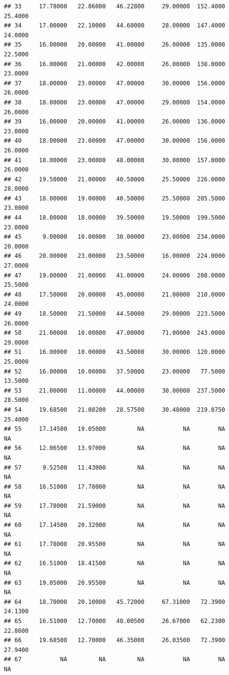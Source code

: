\documentclass[]{article}
\begin{document}
\begin{verbatim}
## 33     17.78000   22.86000   46.22800     29.00000  152.4000     25.4000
## 34     17.00000   22.10000   44.60000     28.00000  147.4000     24.0000
## 35     16.00000   20.00000   41.00000     26.00000  135.0000     22.5000
## 36     16.00000   21.00000   42.00000     26.00000  138.0000     23.0000
## 37     18.00000   23.00000   47.00000     30.00000  156.0000     26.0000
## 38     18.00000   23.00000   47.00000     29.00000  154.0000     26.0000
## 39     16.00000   20.00000   41.00000     26.00000  136.0000     23.0000
## 40     18.00000   23.00000   47.00000     30.00000  156.0000     26.0000
## 41     18.00000   23.00000   48.00000     30.00000  157.0000     26.0000
## 42     19.50000   21.00000   40.50000     25.50000  226.0000     28.0000
## 43     18.00000   19.00000   40.50000     25.50000  205.5000     23.0000
## 44     18.00000   18.00000   39.50000     19.50000  199.5000     23.0000
## 45      9.00000   10.00000   30.00000     23.00000  234.0000     20.0000
## 46     20.00000   23.00000   23.50000     16.00000  224.0000     27.0000
## 47     19.00000   21.00000   41.00000     24.00000  208.0000     25.5000
## 48     17.50000   20.00000   45.00000     21.00000  210.0000     24.0000
## 49     18.50000   21.50000   44.50000     29.00000  223.5000     26.0000
## 50     21.00000   10.00000   47.00000     71.00000  243.0000     29.0000
## 51     16.00000   10.00000   43.50000     30.00000  120.0000     25.0000
## 52     16.00000   10.00000   37.50000     23.00000   77.5000     13.5000
## 53     21.00000   11.00000   44.00000     30.00000  237.5000     28.5000
## 54     19.68500   21.08200   28.57500     30.48000  219.0750     25.4000
## 55     17.14500   19.05000         NA           NA        NA          NA
## 56     12.06500   13.97000         NA           NA        NA          NA
## 57      9.52500   11.43000         NA           NA        NA          NA
## 58     16.51000   17.78000         NA           NA        NA          NA
## 59     17.78000   21.59000         NA           NA        NA          NA
## 60     17.14500   20.32000         NA           NA        NA          NA
## 61     17.78000   20.95500         NA           NA        NA          NA
## 62     16.51000   18.41500         NA           NA        NA          NA
## 63     19.05000   20.95500         NA           NA        NA          NA
## 64     18.70000   20.10000   45.72000     67.31000   72.3900     24.1300
## 65     16.51000   12.70000   40.00500     26.67000   62.2300     22.8600
## 66     19.68500   12.70000   46.35000     26.03500   72.3900     27.9400
## 67           NA         NA         NA           NA        NA          NA

\end{verbatim}
\end{document}

